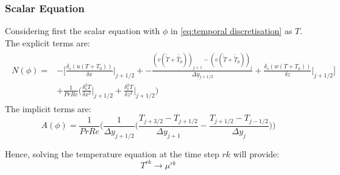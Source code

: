\documentclass[preprint,12pt]{article}
\begin{document}
\subsubsection{Scalar Equation}
Considering first the scalar equation with $\phi$ in \eqref{eq:temporal discretisation} as $T$.
The explicit terms are:
\begin{align}\label{eq:implicit_Temperature_1}
\begin{split}
N(\phi)=&-\Bigg[\frac{ \delta_s(u(T+T_0))}{\delta x}\Big|_{j+1/2}+-\frac{(v(\check{\check{T}}+\check{\check{T_0}}))_{j+1}-(v(\check{\check{T}}+\check{\check{T}}_0))_{j}}{\Delta y_{j+1/2}}+\frac{ \delta_s(w(T+T_0))}{\delta z}\Big|_{j+1/2} \Bigg]\\&+\frac{1}{PrRe}\Bigg(\frac{\delta_s^2T}{\delta x^2}\Bigg|_{j+1/2} +\frac{\delta_s^2T}{\delta z^2}\Bigg|_{j+1/2}\Bigg)
\end{split}\end{align}
The implicit terms are:
\begin{equation}\label{eq:explicit_Temperature_1}
A(\phi)=\frac{1}{PrRe}\Bigg(\frac{1}{\Delta y_{j+1/2}}\Big(\frac{T_{j+3/2}-T_{j+1/2}}{\Delta y_{j+1}}-\frac{T_{j+1/2}-T_{j-1/2}}{\Delta y_{j}}\Big)\Bigg)
\end{equation}

Hence, solving the temperature equation at the time step $rk$ will provide:
\begin{equation}
T^{rk}\rightarrow\mu^{rk}
\end{equation} 
\end{document}
